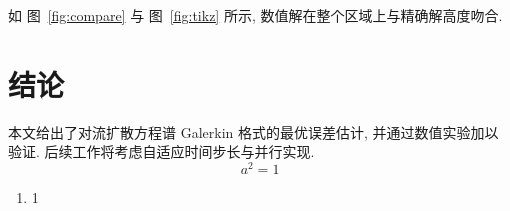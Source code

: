 \documentclass[11pt, a4paper]{ctexart}
\theoremstyle{definition}
\begin{document}
  如 图~\ref{fig:compare} 与 图~\ref{fig:tikz} 所示, 数值解在整个区域上与精确解高度吻合.
  
  \section{结论}
  \label{sec:conclusion}

  本文给出了对流扩散方程谱 Galerkin 格式的最优误差估计, 并通过数值实验加以验证. 后续工作将考虑自适应时间步长与并行实现.
  \begin{equation}
    a^2=1
  \end{equation}
  \begin{enumerate}[label=(\chinese*)]
    \item 1
  \end{enumerate}


\end{document}
